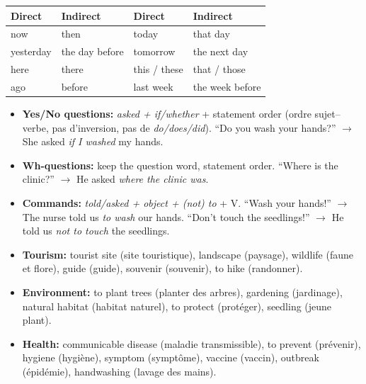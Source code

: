 \documentclass[11pt]{article}
\begin{document}
\begin{propriete}
\begin{center}
\begin{tabularx}{\linewidth}{|X|X|X|X|}\hline
\rowcolor{popgreenL} \textbf{Direct} & \textbf{Indirect} & \textbf{Direct} & \textbf{Indirect} \\ \hline
now & then & today & that day \\ \hline
yesterday & the day before & tomorrow & the next day \\ \hline
here & there & this / these & that / those \\ \hline
ago & before & last week & the week before \\ \hline
\end{tabularx}
\end{center}
\end{propriete}

\begin{propriete}
\begin{itemize}
\item \textbf{Yes/No questions:} \emph{asked + if/whether} + statement order (ordre sujet--verbe, pas d'inversion, pas de \emph{do/does/did}). ``Do you wash your hands?'' $\to$ She asked \emph{if I washed} my hands.
\item \textbf{Wh-questions:} keep the question word, statement order. ``Where is the clinic?'' $\to$ He asked \emph{where the clinic was}.
\item \textbf{Commands:} \emph{told/asked + object + (not) to} + V. ``Wash your hands!'' $\to$ The nurse told us \emph{to wash} our hands. ``Don't touch the seedlings!'' $\to$ He told us \emph{not to touch} the seedlings.
\end{itemize}
\end{propriete}

\begin{exemplebox}
\begin{itemize}
\item \textbf{Tourism:} tourist site (site touristique), landscape (paysage), wildlife (faune et flore), guide (guide), souvenir (souvenir), to hike (randonner).
\item \textbf{Environment:} to plant trees (planter des arbres), gardening (jardinage), natural habitat (habitat naturel), to protect (protéger), seedling (jeune plant).
\item \textbf{Health:} communicable disease (maladie transmissible), to prevent (prévenir), hygiene (hygiène), symptom (symptôme), vaccine (vaccin), outbreak (épidémie), handwashing (lavage des mains).
\end{itemize}
\end{exemplebox}
\end{document}
